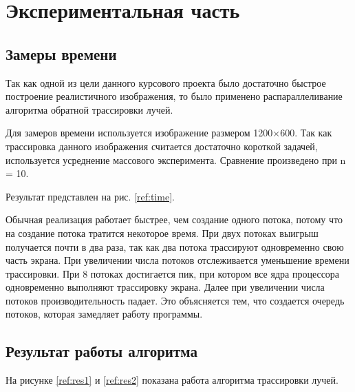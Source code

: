 \chapter{Экспериментальная часть}

\section{Замеры времени}

Так как одной из цели данного курсового проекта было достаточно быстрое
построение реалистичного изображения, то было применено распараллеливание
алгоритма обратной трассировки лучей.

Для замеров времени используется изображение размером 1200$\times$600.
Так как трассировка данного изображения считается достаточно короткой
задачей, используется усреднение массового эксперимента.
Сравнение произведено при n = 10.

Результат представлен на рис. \ref{ref:time}.

\begin{figure}[ht!]
\end{figure}

\newpage

Обычная реализация работает быстрее, чем создание одного потока,
потому что на создание потока тратится некоторое время.
При двух потоках выигрыш получается почти в два раза, так как два потока
трассируют одновременно свою часть экрана.
При увеличении числа потоков отслеживается уменьшение времени трассировки.
При 8 потоках достигается пик, при котором все ядра процессора одновременно
выполняют трассировку экрана.
Далее при увеличении числа потоков производительность падает.
Это объясняется тем, что создается очередь потоков, которая замедляет
работу программы.

\section{Результат работы алгоритма}

На рисунке \ref{ref:res1} и \ref{ref:res2} показана работа алгоритма
трассировки лучей.

\begin{figure}[ht!]
\end{figure}

